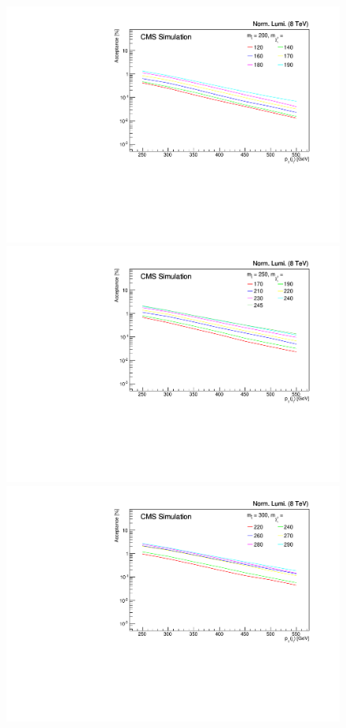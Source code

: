 \begin{figure}[ht!]
\begin{center}
  \includegraphics[scale=0.35]{Figures/sus13009/limitplots/plots/stop/acceptance_200.pdf} 
  \includegraphics[scale=0.35]{Figures/sus13009/limitplots/plots/stop/acceptance_250.pdf}
  \includegraphics[scale=0.35]{Figures/sus13009/limitplots/plots/stop/acceptance_300.pdf} 

\end{center}
\end{figure}
